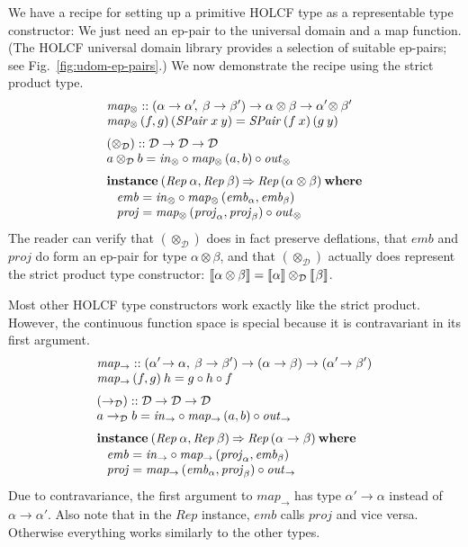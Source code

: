 \documentclass{sigplanconf}
\newcommand{\To}{\mathbin{\Rightarrow}}
\newcommand{\D}{\ensuremath{\mathcal{D}}}
\newcommand{\REP}[1]{\ensuremath{\llbracket#1\rrbracket}}
\newcommand{\hair}{\mskip1mu}
\newcommand{\kwd}[1]{\mathbf{#1}}
\newcommand{\hsc}[1]{\ensuremath{\mathit{#1}}}
\newcommand{\hsemb}{\hsc{emb}}
\newcommand{\hsprj}{\hsc{proj}}
\newcommand{\hsproj}{\hsc{proj}}
\newcommand{\hsRep}{\hsc{Rep}}
\newcommand{\mapProd}{\hsc{map_\otimes}}
\newcommand{\mapFun}{\hsc{map_\to}}
\newcommand{\embedding}{\hsc{in}}
\newcommand{\projection}{\hsc{out}}
\newcommand{\tA}{\alpha}
\newcommand{\tB}{\beta}
\theoremstyle{definition}
\begin{document}
We have a recipe for setting up a primitive HOLCF type as a representable type constructor: We just need an ep-pair to the universal domain and a map function. (The HOLCF universal domain library provides a selection of suitable ep-pairs; see Fig.~\ref{fig:udom-ep-pairs}.) We now demonstrate the recipe using the strict product type.
%
\begin{align*}
  & \mapProd :: (\tA \to \tA'\!,\:\tB \to \tB') \to \tA \otimes \tB \to \tA'\! \otimes \tB' \\[-\jot]
  & \mapProd\,(f, g)\,(\hsc{SPair}\:x\:y) = \hsc{SPair}\,(f\:x)\,(g\:y)
  \\[\jot]
  & (\otimes_\D) :: \D \to \D \to \D \\[-\jot]
  & a \otimes_\D b = \embedding_\otimes \circ \mapProd\,(a, b) \circ \projection_\otimes
  \\[\jot]
  & \kwd{instance}\:(\hsRep\:\tA, \hsRep\:\tB) \To \hsRep\,(\tA \otimes \tB)\:\kwd{where}
  \\[-\jot]
  & \hspace{8pt}
  \begin{alignedat}{2}
    & \hsemb &&= \embedding_\otimes \circ \mapProd\,(\hsemb_\tA, \hsemb_\tB)
    \\[-\jot]
    & \hsproj &&= \mapProd\,(\hsproj_\tA, \hsproj_\tB) \circ \projection_\otimes
  \end{alignedat}
\end{align*}
%
The reader can verify that $(\otimes_\D)$ does in fact preserve deflations, that $\hsemb$ and $\hsproj$ do form an ep-pair for type $\tA\otimes\tB$, and that $(\otimes_\D)$ actually does represent the strict product type constructor: $\REP{\tA\otimes\tB} = \REP{\tA} \otimes_\D \REP{\hair\tB}$.

Most other HOLCF type constructors work exactly like the strict product. However, the continuous function space is special because it is contravariant in its first argument.
%
\begin{align*}
  & \mapFun :: (\tA'\!\to \tA,\:\tB \to \tB') \to (\tA \to \tB) \to (\tA'\! \to \tB') \\[-\jot]
  & \mapFun\,(f, g)\:h = g \circ h \circ f
  \\[\jot]
  & (\to_\D) :: \D \to \D \to \D \\[-\jot]
  & a \to_\D b = \embedding_\to \circ \mapFun\,(a, b) \circ \projection_\to
  \\[\jot]
  & \kwd{instance}\:(\hsRep\:\tA, \hsRep\:\tB) \To \hsRep\,(\tA \to \tB)\:\kwd{where}
  \\[-\jot]
  & \hspace{8pt}
  \begin{alignedat}{2}
    & \hsemb &&= \embedding_\to \circ \mapFun\,(\hsproj_\tA, \hsemb_\tB)
    \\[-\jot]
    & \hsproj &&= \mapFun\,(\hsemb_\tA, \hsproj_\tB) \circ \projection_\to
  \end{alignedat}
\end{align*}
%
Due to contravariance, the first argument to $\mapFun$ has type $\tA'\!\to\tA$ instead of $\tA\to\tA'$. Also note that in the $\hsRep$ instance, $\hsemb$ calls $\hsprj$ and vice versa. Otherwise everything works similarly to the other types.
\end{document}
